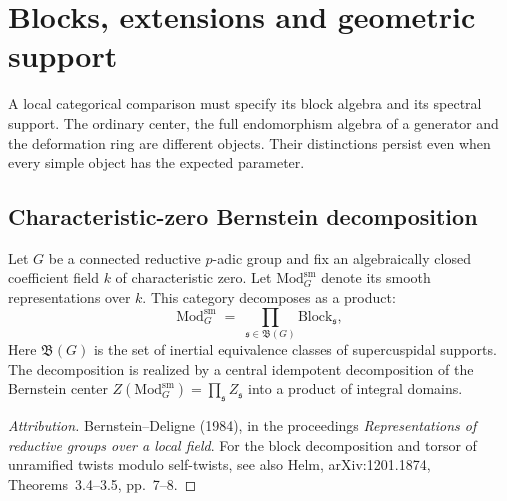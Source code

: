 \section{Blocks, extensions and geometric support}
\label{v4-arith:ic:blocks}

A local categorical comparison must specify its block algebra and
its spectral support. The ordinary center, the full endomorphism
algebra of a generator and the deformation ring are different
objects. Their distinctions persist even when every simple object
has the expected parameter.

\subsection{Characteristic-zero Bernstein decomposition}

\begin{theorem}
\label{v4-arith:ic:w5-f:F1a3-AB:thm:bernstein}
 Let \(G\) be a connected reductive
\(p\)-adic group and fix an algebraically closed coefficient
field \(k\) of characteristic zero. Let \(\mathrm{Mod}^{\mathrm{sm}}_G\) denote its smooth
representations over \(k\). This category decomposes as a product:
\begin{equation}
\label{v4-arith:ic:w5-f:F1a3-AB:eq:bernstein-decomposition}
\mathrm{Mod}^{\mathrm{sm}}_{G}\;=\;\prod_{\mathfrak{s}\in\mathfrak{B}(G)}
\mathrm{Block}_{\mathfrak{s}},
\end{equation}
Here \(\mathfrak{B}(G)\) is the set of inertial equivalence classes
of supercuspidal supports. The decomposition is realized by a
central idempotent decomposition of the Bernstein center
\(Z(\mathrm{Mod}^{\mathrm{sm}}_{G})=\prod_{\mathfrak{s}}Z_{\mathfrak{s}}\)
into a product of integral domains.
\end{theorem}

\begin{proof}[Attribution]
Bernstein--Deligne (1984), in the proceedings
\emph{Representations of reductive groups over a local field}.
For the block decomposition and torsor of unramified twists modulo
self-twists, see also Helm, arXiv:1201.1874, Theorems~3.4--3.5,
pp.~7--8.
\end{proof}

